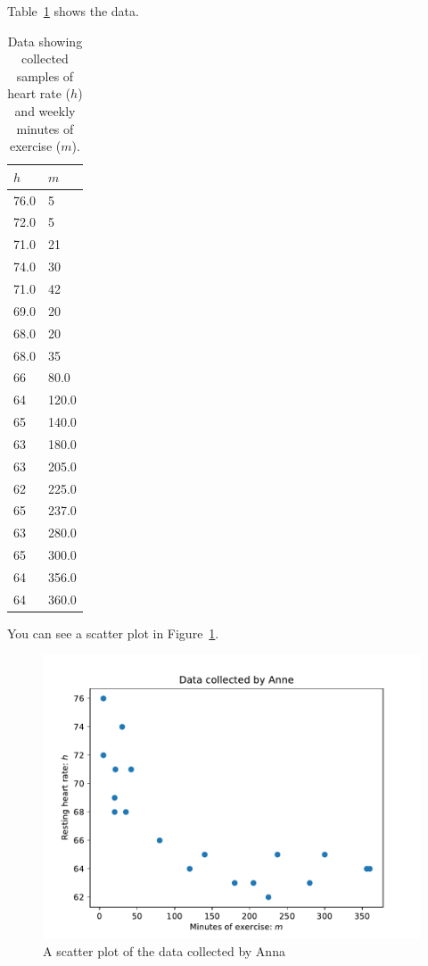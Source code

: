 Table~\ref{tab:data_collected_by_anne} shows the data.

\begin{table}[!htbp]
\begin{center}
\begin{tabular}{ll}
\toprule
\(h\) & \(m\)\\
\midrule
76.0 & 5\\
72.0 & 5\\
71.0 & 21\\
74.0 & 30\\
71.0 & 42\\
69.0 & 20\\
68.0 & 20\\
68.0 & 35\\
66 & 80.0\\
64 & 120.0\\
65 & 140.0\\
63 & 180.0\\
63 & 205.0\\
62 & 225.0\\
65 & 237.0\\
63 & 280.0\\
65 & 300.0\\
64 & 356.0\\
64 & 360.0\\
\bottomrule
\end{tabular}
    \caption{Data showing collected samples of heart rate (\(h\)) and weekly
    minutes of exercise (\(m\)).}
    \label{tab:data_collected_by_anne}
\end{center}
\end{table}



You can see a scatter plot in
Figure~\ref{fig:data_collected_by_anne}.

\begin{figure}[!hbtp]
\begin{center}
\includegraphics[width=.7\textwidth]{./assets/data_collected_by_anne/main.pdf}
\end{center}
\caption{A scatter plot of the data collected by Anna}
\label{fig:data_collected_by_anne}
\end{figure}

